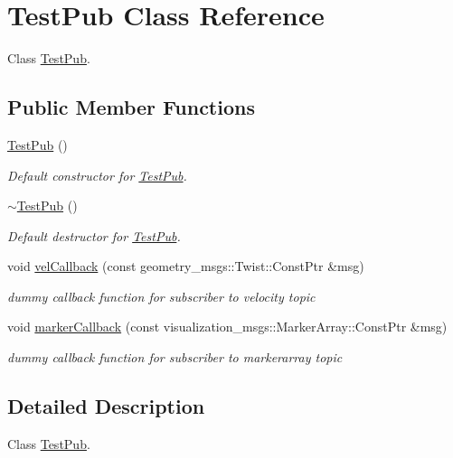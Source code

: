 \hypertarget{classTestPub}{}\section{Test\+Pub Class Reference}
\label{classTestPub}


Class \hyperlink{classTestPub}{Test\+Pub}.  


\subsection*{Public Member Functions}
\begin{DoxyCompactItemize}
\item 
\hyperlink{classTestPub_a9b4b3e8a372a68b5497c098e850f6de8}{Test\+Pub} ()
\begin{DoxyCompactList}\small\item\em Default constructor for \hyperlink{classTestPub}{Test\+Pub}. \end{DoxyCompactList}\item 
\hyperlink{classTestPub_a798e9f6a79e8792af0818ca1ac2ae4e4}{$\sim$\+Test\+Pub} ()
\begin{DoxyCompactList}\small\item\em Default destructor for \hyperlink{classTestPub}{Test\+Pub}. \end{DoxyCompactList}\item 
void \hyperlink{classTestPub_a43fe317ee0c36864777704df28aa0823}{vel\+Callback} (const geometry\+\_\+msgs\+::\+Twist\+::\+Const\+Ptr \&msg)
\begin{DoxyCompactList}\small\item\em dummy callback function for subscriber to velocity topic \end{DoxyCompactList}\item 
void \hyperlink{classTestPub_ae1949455b7b7daaf93c265ce9d2b71bc}{marker\+Callback} (const visualization\+\_\+msgs\+::\+Marker\+Array\+::\+Const\+Ptr \&msg)
\begin{DoxyCompactList}\small\item\em dummy callback function for subscriber to markerarray topic \end{DoxyCompactList}\end{DoxyCompactItemize}


\subsection{Detailed Description}
Class \hyperlink{classTestPub}{Test\+Pub}. 

